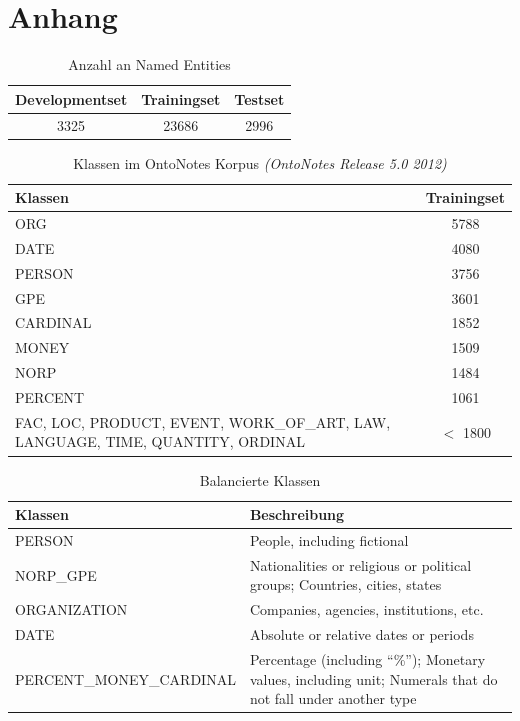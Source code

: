 \documentclass[a4paper, 11pt]{article}
\begin{document}
\section{Anhang}
\begin{table}
	\begin{tabular}{ccc}
	\toprule
	Developmentset & Trainingset & Testset\\
	\midrule
	3325 & 23686 & 2996\\
	\bottomrule
	\end{tabular}
	\caption{Anzahl an  Named Entities}
	\label{tab:datasets}
\end{table}
\begin{table}
\begin{tabularx}{\textwidth}{Xc}
					\toprule
					Klassen  & Trainingset \\
					\midrule
					ORG  & 5788 \\
					DATE & 4080  \\
					PERSON & 3756 \\
					GPE & 3601 \\
					CARDINAL & 1852 \\
					MONEY & 1509  \\
					NORP & 1484 \\
					PERCENT & 1061  \\
					FAC, LOC, PRODUCT, EVENT, WORK\_OF\_ART, LAW, LANGUAGE, TIME, QUANTITY, ORDINAL & $<$ 1800 \\
					\bottomrule
\end{tabularx}
\caption{Klassen im OntoNotes Korpus \textit{(OntoNotes Release 5.0 2012)}}
\label{tab:klassenOntoNotes}
\end{table}
\begin{table}
			\begin{tabularx}{\textwidth}{lX}
				\toprule
				Klassen  & Beschreibung \\
				\midrule
				PERSON 	& People, including fictional \\
				NORP\_GPE &	Nationalities or religious or political groups;
				Countries, cities, states\\
				ORGANIZATION &	Companies, agencies, institutions, etc.\\
				DATE &	Absolute or relative dates or periods\\
				PERCENT\_MONEY\_CARDINAL &	Percentage (including “\%”);
				Monetary values, including unit;
				Numerals that do not fall under another type \\
				\bottomrule
			\end{tabularx}
			\caption{Balancierte Klassen}
			\label{tab:balancierteKlassen}
\end{table}
\end{document}
